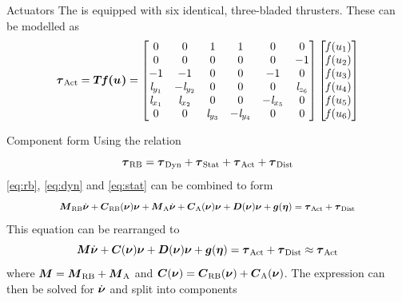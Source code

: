\documentclass[11pt]{beamer}
\newcommand\scalemath[2]{\scalebox{#1}{\mbox{\ensuremath{\displaystyle #2}}}}
\begin{document}
\begin{frame}{Actuators}
The \abbrROV is equipped with six identical, three-bladed thrusters. These can be modelled as
\begin{align}\label{eq:act}
    \boldsymbol{\tau}_{\text{Act}} =  \boldsymbol{T} \boldsymbol{\mathit{f}(u_{})} 
    =
    \begin{bmatrix}
    0& 0& 1& 1& 0& 0\\
    0& 0& 0&  0& 0& -1\\
    -1& -1& 0& 0& -1& 0\\
    \mathit{l}_{y_{1}} & -\mathit{l}_{y_{2}} & 0 &  0 &  0 & \mathit{l}_{z_{6}} \\
    \mathit{l}_{x_{1}} & \mathit{l}_{x_{2}} & 0 & 0 & -\mathit{l}_{x_{5}} & 0 \\
    0 & 0 & \mathit{l}_{y_{3}} & -\mathit{l}_{y_{4}} & 0 & 0 \\
    \end{bmatrix}
    \begin{bmatrix}
    \mathit{f}(u_{1}) \\
    \mathit{f}(u_{2}) \\
    \mathit{f}(u_{3}) \\
    \mathit{f}(u_{4}) \\
    \mathit{f}(u_{5}) \\
    \mathit{f}(u_{6}) \\
    \end{bmatrix}
\end{align}
\end{frame}

\begin{frame}{Component form}
Using the relation
\begin{equation}
\boldsymbol{\tau}_{\text{RB}} = \boldsymbol{\tau}_{\text{Dyn}} + \boldsymbol{\tau}_{\text{Stat}} + \boldsymbol{\tau}_{\text{Act}} + \boldsymbol{\tau}_{\text{Dist}}
\end{equation} \eqref{eq:rb}, \eqref{eq:dyn} and \eqref{eq:stat} can be combined to form
\begin{equation}
\scalemath{0.85}{\inertia_{\text{RB}}\dot{\nuVector} + \coriolis_{\text{RB}}(\nuVector)\nuVector + \inertia_{\text{A}} \dot{\nuVector} +\coriolis_{\text{A}}(\nuVector)\nuVector + \damping(\nuVector)\nuVector + \gravity(\etaVector) = \tauVector_\text{{Act}} + \tauVector_{\text{Dist}}}
\end{equation}
This equation can be rearranged to
\begin{equation}
\boldsymbol{M} \dot{\boldsymbol{\nu}} + \boldsymbol{C}(\boldsymbol{\nu})\boldsymbol{\nu} + \boldsymbol{D}(\boldsymbol{\nu})\boldsymbol{\nu} + \boldsymbol{g}(\boldsymbol{\eta}) = \boldsymbol{\tau}_{\text{Act}} + \boldsymbol{\tau}_{\text{Dist}} \approx \boldsymbol{\tau}_{\text{Act}}
\end{equation}
where $\boldsymbol{M} = \boldsymbol{M}_{\text{RB}} + \boldsymbol{M}_{\text{A}}$ and $\boldsymbol{C}(\boldsymbol{\nu})=\boldsymbol{C}_{\text{RB}}(\boldsymbol{\nu})+\boldsymbol{C}_{\text{A}}(\boldsymbol{\nu})$.
The expression can then be solved for $\dot{\boldsymbol{\nu}}$ and split into components 

\end{frame}
\end{document}
